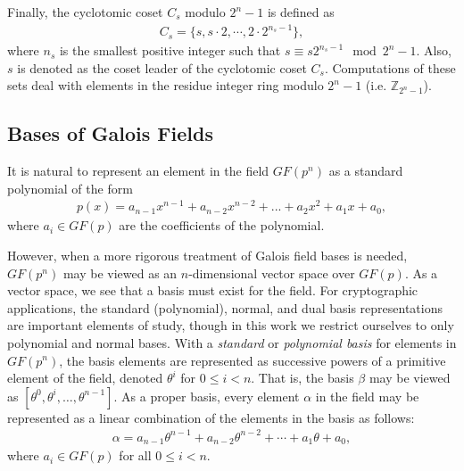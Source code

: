 Finally, the cyclotomic coset $C_s$ modulo $2^n - 1$ \cite{MacWilliams86-1} is defined as
\begin{align*}
C_s = \{s, s \cdot 2, \dotsb, 2 \cdot 2^{n_s - 1}\},
\end{align*}
where $n_s$ is the smallest positive integer such that $s \equiv s2^{n_s - 1}\mod 2^n - 1$. Also, $s$ is denoted as the coset leader of the cyclotomic coset $C_s$. Computations of these sets deal with elements in the residue integer ring modulo $2^n - 1$ (i.e. $\mathbb{Z}_{2^n - 1}$). 

\subsection{Bases of Galois Fields} \label{sec:ffBasis}
It is natural to represent an element in the field $GF(p^n)$ as a standard polynomial of the form
\begin{align*}
p(x) = a_{n-1}x^{n-1} + a_{n-2}x^{n-2} + ... + a_2x^2 + a_1x + a_0,
\end{align*}
where $a_i \in GF(p)$ are the coefficients of the polynomial. 

However, when a more rigorous treatment of Galois field bases is needed, $GF(p^n)$ may be viewed as an $n$-dimensional vector space over $GF(p)$. As a vector space, we see that a basis must exist for the field. For cryptographic applications, the standard (polynomial), normal, and dual basis representations are important elements of study, though in this work we restrict ourselves to only polynomial and normal bases. With a \emph{standard} or \emph{polynomial basis} for elements in $GF(p^n)$, the basis elements are represented as successive powers of a primitive element of the field, denoted $\theta^i$ for $0 \leq i < n$. That is, the basis $\beta$ may be viewed as $[\theta^0,\theta^i,\dots,\theta^{n-1}]$. As a proper basis, every element $\alpha$ in the field may be represented as a linear combination of the elements in the basis as follows:
\begin{align*}
\alpha = a_{n-1}\theta^{n-1} + a_{n-2}\theta^{n-2} + \dotsb + a_{1}\theta + a_0,
\end{align*}
where $a_i \in GF(p)$ for all $0 \leq i < n$.

